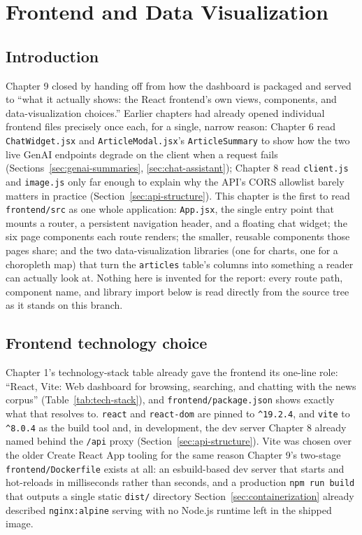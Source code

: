 \chapter{Frontend and Data Visualization}

\section{Introduction}
\label{sec:frontend-intro}
\begin{sloppypar}
Chapter 9 closed by handing off from how the dashboard is packaged and served to ``what it actually shows: the React frontend's own views, components, and data-visualization choices.'' Earlier chapters had already opened individual frontend files precisely once each, for a single, narrow reason: Chapter 6 read \texttt{ChatWidget.jsx} and \texttt{ArticleModal.jsx}'s \texttt{ArticleSummary} to show how the two live GenAI endpoints degrade on the client when a request fails (Sections~\ref{sec:genai-summaries}, \ref{sec:chat-assistant}); Chapter 8 read \texttt{client.js} and \texttt{image.js} only far enough to explain why the API's CORS allowlist barely matters in practice (Section~\ref{sec:api-structure}). This chapter is the first to read \texttt{frontend/\allowbreak src} as one whole application: \texttt{App.jsx}, the single entry point that mounts a router, a persistent navigation header, and a floating chat widget; the six page components each route renders; the smaller, reusable components those pages share; and the two data-visualization libraries (one for charts, one for a choropleth map) that turn the \texttt{articles} table's columns into something a reader can actually look at. Nothing here is invented for the report: every route path, component name, and library import below is read directly from the source tree as it stands on this branch.
\end{sloppypar}

\section{Frontend technology choice}
\label{sec:frontend-tech}
\begin{sloppypar}
Chapter 1's technology-stack table already gave the frontend its one-line role: ``React, Vite: Web dashboard for browsing, searching, and chatting with the news corpus'' (Table~\ref{tab:tech-stack}), and \texttt{frontend/\allowbreak package.json} shows exactly what that resolves to. \texttt{react} and \texttt{react-dom} are pinned to \texttt{\textasciicircum19.2.4}, and \texttt{vite} to \texttt{\textasciicircum8.0.4} as the build tool and, in development, the dev server Chapter 8 already named behind the \texttt{/api} proxy (Section~\ref{sec:api-structure}). Vite was chosen over the older Create React App tooling for the same reason Chapter 9's two-stage \texttt{frontend/\allowbreak Dockerfile} exists at all: an esbuild-based dev server that starts and hot-reloads in milliseconds rather than seconds, and a production \texttt{npm run build} that outputs a single static \texttt{dist/} directory Section~\ref{sec:containerization} already described \texttt{nginx:alpine} serving with no Node.js runtime left in the shipped image.
\end{sloppypar}

